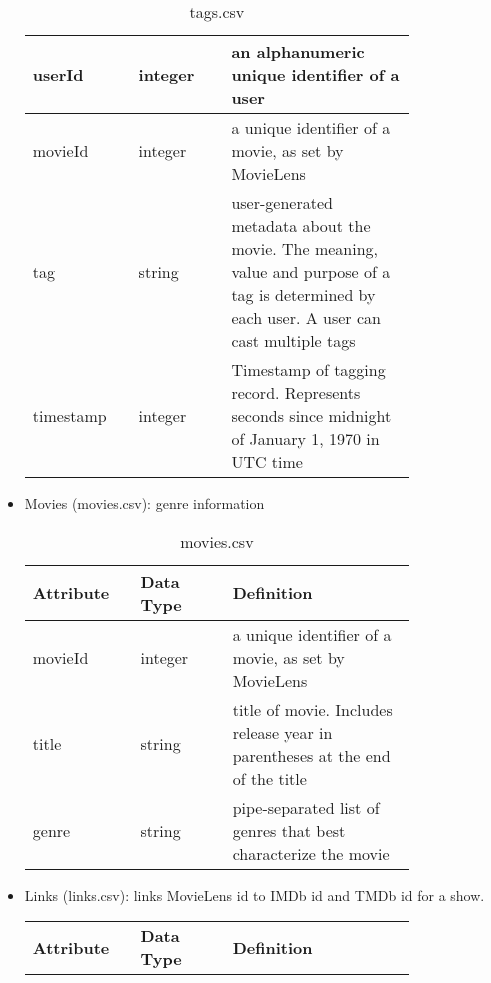 \documentclass[10pt,titlepage]{article}
\begin{document}
\begin{itemize}
\begin{table}[H]
\begin{tabular}{p{0.2\linewidth} | p{0.2\linewidth} | p{0.4\linewidth}}
                \hline
                userId & integer & an alphanumeric unique identifier of a user \\
                \hline
                movieId & integer & a unique identifier of a movie, as set by MovieLens \\
                \hline
                tag & string & user-generated metadata about the movie. The meaning, value and purpose of a tag is determined by each user. A user can cast multiple tags \\
                \hline
                timestamp & integer & Timestamp of tagging record. Represents seconds since midnight of January 1, 1970 in UTC time \\
                \hline

            \end{tabular}

            \caption{tags.csv}
            \label{tab:ml_tags}
        \end{table}

    \item Movies (movies.csv): genre information

        \begin{table}[H]
            \centering
            \begin{tabular}{p{0.2\linewidth} | p{0.2\linewidth} | p{0.4\linewidth}}
                \hline
                \textbf{Attribute} & \textbf{Data Type}  & \textbf{Definition}\\

                \hline
                movieId & integer & a unique identifier of a movie, as set by MovieLens \\
                \hline
                title & string & title of movie. Includes release year in parentheses at the end of the title \\
                \hline
                genre & string & pipe-separated list of genres that best characterize the movie \\
                \hline
            \end{tabular}

            \caption{movies.csv}
            \label{tab:ml_movies}
        \end{table}

    \item Links (links.csv): links MovieLens id to IMDb id and TMDb id for a show.

        \begin{table}[H]
            \centering
            \begin{tabular}{p{0.2\linewidth} | p{0.2\linewidth} | p{0.4\linewidth}}
                \hline
                \textbf{Attribute} & \textbf{Data Type}  & \textbf{Definition}\\


\end{tabular}
\end{table}
\end{itemize}
\end{document}

